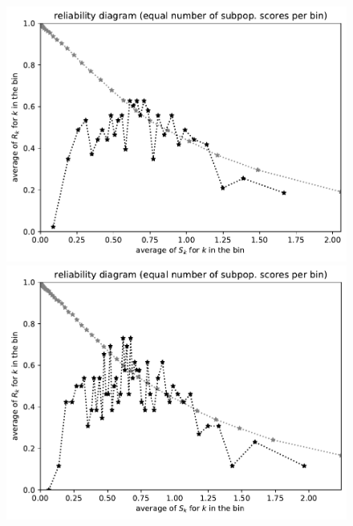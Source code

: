 \documentclass{article}
\begin{document}
\begin{figure}
\begin{centering}
\parbox{\imsize}{\includegraphics[width=\imsize]
{./codes/unweighted/nll-1-68-sidewinder-horned-rattlesnake-Crotalus-cerastesequisamps30}}
\quad\quad
\parbox{\imsize}{\includegraphics[width=\imsize]
{./codes/unweighted/nll-1-68-sidewinder-horned-rattlesnake-Crotalus-cerastesequisamps50}}

\vspace{\vertsep}


\end{centering}
\end{figure}
\end{document}
